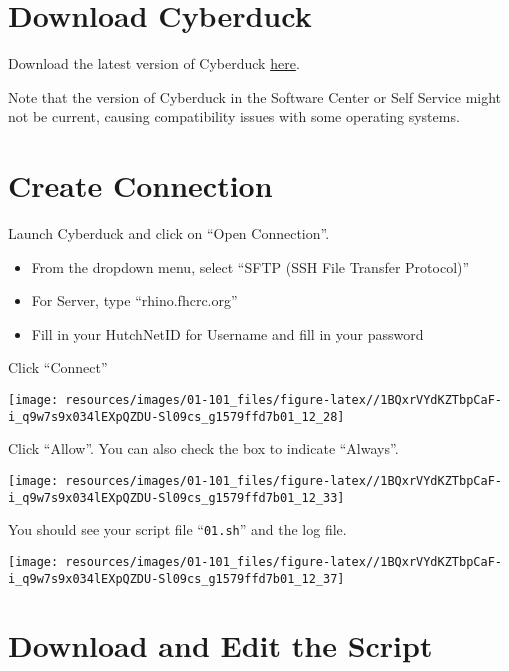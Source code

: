 \documentclass[
]{book}
\providecommand{\tightlist}{%
  \setlength{\itemsep}{0pt}\setlength{\parskip}{0pt}}
\begin{document}
\hypertarget{download-cyberduck}{%
\section{Download Cyberduck}\label{download-cyberduck}}

Download the latest version of Cyberduck \href{https://cyberduck.io/download/}{here}.

Note that the version of Cyberduck in the Software Center or Self Service might not be current, causing compatibility issues with some operating systems.

\hypertarget{create-connection}{%
\section{Create Connection}\label{create-connection}}

Launch Cyberduck and click on ``Open Connection''.

\begin{itemize}
\tightlist
\item
  From the dropdown menu, select ``SFTP (SSH File Transfer Protocol)''
\item
  For Server, type ``rhino.fhcrc.org''
\item
  Fill in your HutchNetID for Username and fill in your password
\end{itemize}

Click ``Connect''

\texttt{[image: resources/images/01-101\_files/figure-latex//1BQxrVYdKZTbpCaF-i\_q9w7s9x034lEXpQZDU-Sl09cs\_g1579ffd7b01\_12\_28]}

Click ``Allow''. You can also check the box to indicate ``Always''.

\texttt{[image: resources/images/01-101\_files/figure-latex//1BQxrVYdKZTbpCaF-i\_q9w7s9x034lEXpQZDU-Sl09cs\_g1579ffd7b01\_12\_33]}

You should see your script file ``\texttt{01.sh}'' and the log file.

\texttt{[image: resources/images/01-101\_files/figure-latex//1BQxrVYdKZTbpCaF-i\_q9w7s9x034lEXpQZDU-Sl09cs\_g1579ffd7b01\_12\_37]}

\hypertarget{download-and-edit-the-script}{%
\section{Download and Edit the Script}\label{download-and-edit-the-script}}
\end{document}
